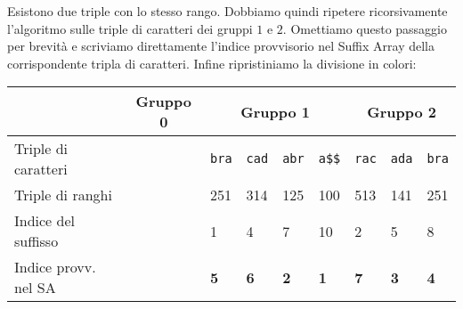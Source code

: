 Esistono due triple con lo stesso rango. Dobbiamo quindi ripetere ricorsivamente
l'algoritmo \dc sulle triple di caratteri dei gruppi \(1\) e \(2\). Omettiamo
questo passaggio per brevit\`a e scriviamo direttamente l'indice provvisorio nel 
Suffix Array della corrispondente tripla di caratteri. Infine ripristiniamo la 
divisione in colori:
\begin{table}[H]
  \begin{tabularx}{\linewidth}{l*{11}{X}}
                        & \multicolumn{4}{c}{Gruppo 0 \cellcolor{green} } 
                        & \multicolumn{4}{c}{Gruppo 1 \cellcolor{red} } 
                        & \multicolumn{3}{c}{Gruppo 2 \cellcolor{yellow} }\\
    \hline
    Triple di caratteri & \multicolumn{4}{c}{\cellcolor{gray!25}}
                        & \texttt{bra} & \texttt{cad} & \texttt{abr} & \texttt{a\$\$}
                        & \texttt{rac} & \texttt{ada} & \texttt{bra} \\
    Triple di ranghi    & \multicolumn{4}{c}{\cellcolor{gray!25}}
                        & 251 & 314 & 125 & 100
                        & 513 & 141 & 251 \\
    Indice del suffisso & \multicolumn{4}{c}{\cellcolor{gray!25}}
                        & 1 & 4 & 7 & 10
                        & 2 & 5 & 8 \\
    Indice provv. nel SA & \multicolumn{4}{c}{\cellcolor{gray!25}}
                        & \textbf{5} & \textbf{6} & \textbf{2} & \textbf{1}
                        & \textbf{7} & \textbf{3} & \textbf{4} \\
  \end{tabularx}
\end{table}

